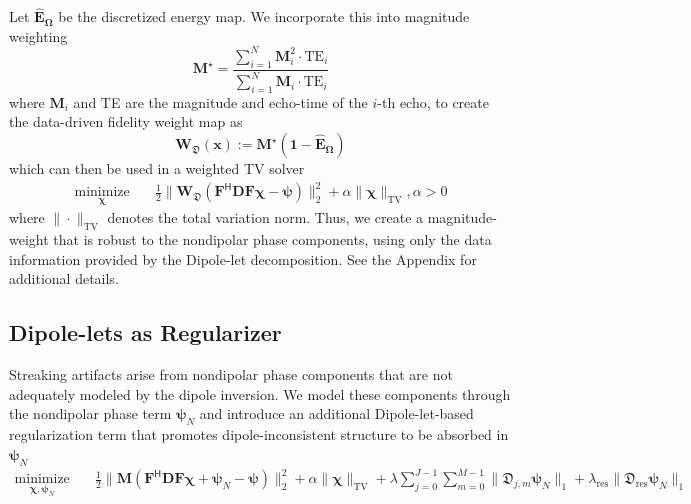 \documentclass{article}
\newcommand{\bx}{\bm{x}}
\begin{document}
Let $\mathbf{\widehat{E}_{\Omega}}$ be the discretized energy map. We incorporate this into magnitude weighting
\begin{equation}
\label{magnitudeWeight}
    \mathbf{M}^{\star} = \frac{\sum_{i=1}^{N}{\mathbf{M}_{i}^{2}}\cdot\text{TE}_{i}}{\sum_{i=1}^{N}{\mathbf{M}_{i}}\cdot\text{TE}_{i}}
\end{equation}
where $\mathbf{M}_{i}$ and TE are the magnitude and echo-time of the $i$-th echo, to create the data-driven fidelity weight map as
\begin{equation}
\label{eqn:DipoleletsWeight}
    \mathbf{W}_{\mathfrak{D}}(\bx):= \mathbf{M}^{\star}(\mathbf{1}- \mathbf{\widehat{E}_{\Omega}})
\end{equation}
which can then be used in a weighted TV solver
\begin{equation}
    \label{weightedTV}
            \begin{aligned}
                \underset{\bm{\chi}}{\text{minimize}} \quad & \frac{1}{2}\|\mathbf{W}_{\mathfrak{D}}(\mathbf{F}^{\mathsf{H}}\mathbf{D}\mathbf{F}\bm{\chi}-\bm{\psi})\|_{2}^{2}+\alpha \|\bm{\chi}\|_{\text{TV}}, \alpha>0
            \end{aligned}
\end{equation}
\noindent
where $\|\cdot\|_{\text{TV}}$ denotes %
the total variation norm. Thus, we create a magnitude-weight that is robust to the nondipolar phase components, using only the data information provided by the Dipole-let decomposition. See the Appendix for additional details.
\subsection{Dipole-lets as Regularizer}
\label{sec:methodsRegularizer}
Streaking artifacts arise from nondipolar phase components that are not adequately modeled by the dipole inversion. We model these components through the nondipolar phase term $\bm{\psi}_{N}$ and introduce an additional Dipole-let-based regularization term that promotes dipole-inconsistent structure to be absorbed in $\bm{\psi}_N$ 
\begin{equation}
\label{eqn:dipoleletRegularizer}
    \begin{aligned}
                \underset{\bm{\chi},\bm{\psi}_{N}}{\text{minimize}} \quad &\frac{1}{2}\|\mathbf{M}(\mathbf{F}^{\mathsf{H}}\mathbf{D}\mathbf{F}\bm{\chi}+ \bm{\psi}_{N} - \bm{\psi})\|_{2}^{2} +
                \alpha \|\bm{\chi}\|_{\text{TV}}+\lambda\sum_{j=0}^{J-1}\sum_{m=0}^{M-1} \|\bm{\mathfrak{D}}_{j,m}\bm{\psi}_{N}\|_{1} + \lambda_{\text{res}}\|\bm{\mathfrak{D}}_{\text{res}}\bm{\psi}_{N}\|_{1}
            \end{aligned}
\end{equation}
\end{document}
